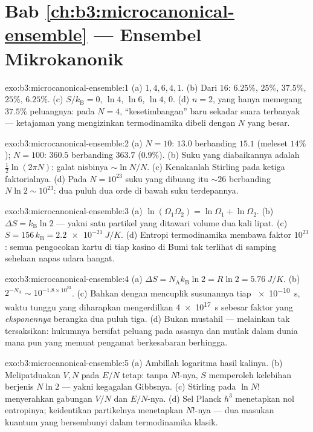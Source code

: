 \section*{Bab \ref{ch:b3:microcanonical-ensemble} --- Ensembel Mikrokanonik}

\begin{solution}{exo:b3:microcanonical-ensemble:1}
(a) $1, 4, 6, 4, 1$. (b) Dari $16$: $6.25\%$, $25\%$, $37.5\%$,
$25\%$, $6.25\%$. (c) $S/k_{\text{B}} = 0$, $\ln4$, $\ln6$, $\ln4$,
$0$. (d) $n = 2$, yang hanya memegang $37.5\%$ peluangnya: pada
$N = 4$, ``kesetimbangan'' baru sekadar suara terbanyak --- ketajaman
yang mengizinkan termodinamika dibeli dengan $N$ yang besar.
\end{solution}

\begin{solution}{exo:b3:microcanonical-ensemble:2}
(a) $N = 10$: $13.0$ berbanding $15.1$ (meleset $14\%$); $N = 100$:
$360.5$ berbanding $363.7$ ($0.9\%$). (b) Suku yang diabaikannya adalah
$\tfrac12\ln(2\pi N)$: galat nisbinya $\sim\ln N/N$. (c) Kenakanlah
Stirling pada ketiga faktorialnya. (d) Pada $N = 10^{23}$ suku yang
dibuang itu $\sim26$ berbanding $N\ln2 \sim 10^{23}$: dua puluh dua orde
di bawah suku terdepannya.
\end{solution}

\begin{solution}{exo:b3:microcanonical-ensemble:3}
(a) $\ln(\Omega_1\Omega_2) = \ln\Omega_1 + \ln\Omega_2$. (b)
$\Delta S = k_{\text{B}}\ln2$ --- yakni satu partikel yang ditawari
volume dua kali lipat. (c) $S = 156\,k_{\text{B}} = \qty{2.2e-21}{J/K}$. (d)
Entropi termodinamika membawa faktor $10^{23}$: semua pengocokan kartu di
tiap kasino di Bumi tak terlihat di samping sehelaan napas udara hangat.
\end{solution}

\begin{solution}{exo:b3:microcanonical-ensemble:4}
(a) $\Delta S = N_{\text{A}}k_{\text{B}}\ln2 = R\ln2 =
\qty{5.76}{J/K}$. (b) $2^{-N_{\text{A}}} \sim 10^{-1.8\times
10^{23}}$. (c) Bahkan dengan mencuplik susunannya tiap \qty{e-10}{s},
waktu tunggu yang diharapkan mengerdilkan \qty{4e17}{s} sebesar faktor
yang \emph{eksponennya} berangka dua puluh tiga. (d) Bukan mustahil ---
melainkan tak tersaksikan: hukumnya bersifat peluang pada asasnya dan
mutlak dalam dunia mana pun yang memuat pengamat berkesabaran berhingga.
\end{solution}

\begin{solution}{exo:b3:microcanonical-ensemble:5}
(a) Ambillah logaritma hasil kalinya. (b) Melipatduakan $V, N$ pada
$E/N$ tetap: tanpa $N!$-nya, $S$ memperoleh kelebihan berjenis $N\ln2$
--- yakni kegagalan Gibbsnya. (c) Stirling pada $\ln N!$ menyerahkan
gabungan $V/N$ dan $E/N$-nya. (d) Sel Planck $h^3$ menetapkan nol
entropinya; keidentikan partikelnya menetapkan $N!$-nya --- dua masukan
kuantum yang bersembunyi dalam termodinamika klasik.
\end{solution}

